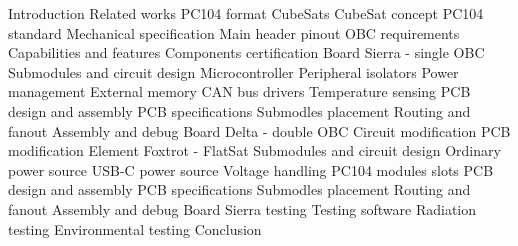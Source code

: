 
\draft     %

\makefront  %

\chap Introduction
\chap Related works
\chap PC104 format CubeSats
\sec CubeSat concept
\sec PC104 standard
\secc Mechanical specification
\secc Main header pinout
\sec OBC requirements
\secc Capabilities and features 
\secc Components certification
%
\chap Board Sierra - single OBC
\sec Submodules and circuit design
\secc Microcontroller
\secc Peripheral isolators
\secc Power management
\secc External memory
\secc CAN bus drivers
\secc Temperature sensing
\sec PCB design and assembly
\secc PCB specifications
\secc Submodles placement
\secc Routing and fanout
\secc Assembly and debug
\sec Board Delta - double OBC
\secc Circuit modification
\secc PCB modification
%
\chap Element Foxtrot - FlatSat
\sec Submodules and circuit design
\secc Ordinary power source
\secc USB-C power source
\secc Voltage handling
\secc PC104 modules slots
\sec PCB design and assembly
\secc PCB specifications
\secc Submodles placement
\secc Routing and fanout
\secc Assembly and debug
%
\chap Board Sierra testing
\sec Testing software
\sec Radiation testing
\sec Environmental testing
%
\chap Conclusion

\bye
